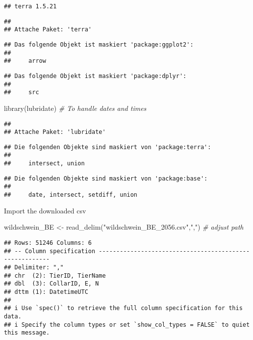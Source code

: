 \documentclass[
]{article}
\newenvironment{Shaded}{\begin{snugshade}}{\end{snugshade}}
\newcommand{\CommentTok}[1]{\textcolor[rgb]{0.56,0.35,0.01}{\textit{#1}}}
\newcommand{\FunctionTok}[1]{\textcolor[rgb]{0.00,0.00,0.00}{#1}}
\newcommand{\NormalTok}[1]{#1}
\newcommand{\OtherTok}[1]{\textcolor[rgb]{0.56,0.35,0.01}{#1}}
\newcommand{\StringTok}[1]{\textcolor[rgb]{0.31,0.60,0.02}{#1}}
\begin{document}
\begin{verbatim}
## terra 1.5.21
\end{verbatim}

\begin{verbatim}
## 
## Attache Paket: 'terra'
\end{verbatim}

\begin{verbatim}
## Das folgende Objekt ist maskiert 'package:ggplot2':
## 
##     arrow
\end{verbatim}

\begin{verbatim}
## Das folgende Objekt ist maskiert 'package:dplyr':
## 
##     src
\end{verbatim}

\begin{Shaded}
\begin{Highlighting}[]
\FunctionTok{library}\NormalTok{(lubridate)    }\CommentTok{\# To handle dates and times}
\end{Highlighting}
\end{Shaded}

\begin{verbatim}
## 
## Attache Paket: 'lubridate'
\end{verbatim}

\begin{verbatim}
## Die folgenden Objekte sind maskiert von 'package:terra':
## 
##     intersect, union
\end{verbatim}

\begin{verbatim}
## Die folgenden Objekte sind maskiert von 'package:base':
## 
##     date, intersect, setdiff, union
\end{verbatim}

Import the downloaded csv

\begin{Shaded}
\begin{Highlighting}[]
\NormalTok{wildschwein\_BE }\OtherTok{\textless{}{-}} \FunctionTok{read\_delim}\NormalTok{(}\StringTok{"wildschwein\_BE\_2056.csv"}\NormalTok{,}\StringTok{","}\NormalTok{) }\CommentTok{\# adjust path}
\end{Highlighting}
\end{Shaded}

\begin{verbatim}
## Rows: 51246 Columns: 6
## -- Column specification --------------------------------------------------------
## Delimiter: ","
## chr  (2): TierID, TierName
## dbl  (3): CollarID, E, N
## dttm (1): DatetimeUTC
## 
## i Use `spec()` to retrieve the full column specification for this data.
## i Specify the column types or set `show_col_types = FALSE` to quiet this message.
\end{verbatim}
\end{document}
